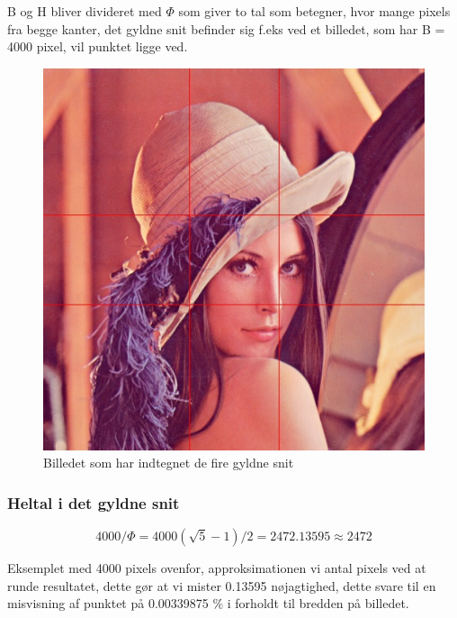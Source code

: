 B og H bliver divideret med $\varPhi$ som giver to tal som betegner, hvor
mange pixels fra begge kanter, det gyldne snit befinder sig f.eks ved et
billedet, som har B = 4000 pixel, vil punktet ligge ved.

\begin{figure}[h]
	\begin{center}
		\includegraphics[scale=0.42,angle=0]{afsnit/vores_implementation/billeder/naiv_algoritme/Lenagolden}
	\end{center}
	\caption[]{Billedet som har indtegnet de fire gyldne snit}
	\label{lenasnit2}
\end{figure}

\subsubsection*{Heltal i det gyldne snit}

\begin{equation}
	4000/\varPhi = 4000(\sqrt{5}-1)/2 = 2472.13595 \approx 2472
\end{equation}

Eksemplet med 4000 pixels ovenfor, approksimationen vi antal pixels ved at
runde resultatet, dette gør at vi mister 0.13595 nøjagtighed, dette svare
til en misvisning af punktet på 0.00339875 $\%$ i forholdt til bredden på
billedet. 

